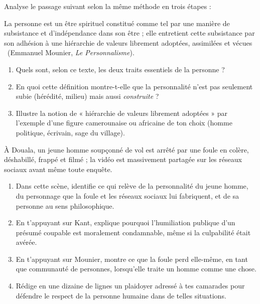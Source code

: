 \documentclass[11pt]{article}
\newcommand{\cle}[1]{{\popxbold\color{popdark}#1}}
\begin{document}
\begin{exercice}
Analyse le passage suivant selon la même méthode en trois étapes :
\begin{center}
\guillemotleft La personne est un être spirituel constitué comme tel par une manière de subsistance et d'indépendance dans son être ; elle entretient cette subsistance par son adhésion à une hiérarchie de valeurs librement adoptées, assimilées et vécues \guillemotright\ (Emmanuel Mounier, \emph{Le Personnalisme}).
\end{center}
\begin{enumerate}
\item Quels sont, selon ce texte, les deux traits essentiels de la personne ?
\item En quoi cette définition montre-t-elle que la personnalité n'est pas seulement subie (hérédité, milieu) mais aussi \emph{construite} ?
\item Illustre la notion de « hiérarchie de valeurs librement adoptées » par l'exemple d'une figure camerounaise ou africaine de ton choix (homme politique, écrivain, sage du village).
\end{enumerate}
\end{exercice}

\begin{exercice}
À Douala, un jeune homme soupçonné de vol est arrêté par une foule en colère, déshabillé, frappé et filmé ; la vidéo est massivement partagée sur les réseaux sociaux avant même toute enquête.
\begin{enumerate}
\item Dans cette scène, identifie ce qui relève de la \cle{personnalité} du jeune homme, du \cle{personnage} que la foule et les réseaux sociaux lui fabriquent, et de sa \cle{personne} au sens philosophique.
\item En t'appuyant sur Kant, explique pourquoi l'humiliation publique d'un présumé coupable est moralement condamnable, même si la culpabilité était avérée.
\item En t'appuyant sur Mounier, montre ce que la foule perd elle-même, en tant que communauté de personnes, lorsqu'elle traite un homme comme une chose.
\item Rédige en une dizaine de lignes un plaidoyer adressé à tes camarades pour défendre le respect de la personne humaine dans de telles situations.
\end{enumerate}
\end{exercice}
\end{document}
